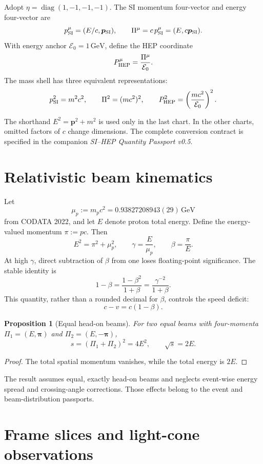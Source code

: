 \documentclass[11pt,a4paper]{article}
\theoremstyle{definition}
\theoremstyle{plain}
\newtheorem{proposition}[definition]{Proposition}
\theoremstyle{remark}
\newcommand{\diag}{\operatorname{diag}}
\newcommand{\GeV}{\mathrm{GeV}}
\newcommand{\Ecal}{\mathcal E}
\begin{document}
Adopt \(\eta=\diag(1,-1,-1,-1)\). The SI momentum four-vector and
energy four-vector are
\[
p^\mu_{\rm SI}=(E/c,\bm p_{\rm SI}),\qquad
\Pi^\mu=c\,p^\mu_{\rm SI}=(E,c\bm p_{\rm SI}).
\]
With energy anchor \(\Ecal_0=1\,\GeV\), define the HEP coordinate
\[
P^\mu_{\rm HEP}=\frac{\Pi^\mu}{\Ecal_0}.
\]
The mass shell has three equivalent representations:
\[
p_{\rm SI}^2=m^2c^2,\qquad
\Pi^2=(mc^2)^2,\qquad
P_{\rm HEP}^2=\left(\frac{mc^2}{\Ecal_0}\right)^2.
\]

The shorthand \(E^2=\bm p^2+m^2\) is used only in the last chart.
In the other charts, omitted factors of \(c\) change dimensions.
The complete conversion contract is specified in the companion
\emph{SI--HEP Quantity Passport v0.5}.

\section{Relativistic beam kinematics}

Let
\[
\mu_p:=m_pc^2=0.93827208943(29)\,\GeV
\]
from CODATA 2022, and let \(E\) denote proton total energy. Define the
energy-valued momentum \(\pi:=pc\). Then
\[
E^2=\pi^2+\mu_p^2,\qquad
\gamma=\frac{E}{\mu_p},\qquad
\beta=\frac{\pi}{E}.
\]
At high \(\gamma\), direct subtraction of \(\beta\) from one loses
floating-point significance. The stable identity is
\[
1-\beta
=\frac{1-\beta^2}{1+\beta}
=\frac{\gamma^{-2}}{1+\beta}.
\]
This quantity, rather than a rounded decimal for \(\beta\), controls
the speed deficit:
\[
c-v=c(1-\beta).
\]

\begin{proposition}[Equal head-on beams]
For two equal beams with four-momenta
\(\Pi_1=(E,\bm\pi)\) and
\(\Pi_2=(E,-\bm\pi)\),
\[
s=(\Pi_1+\Pi_2)^2=4E^2,\qquad \sqrt{s}=2E.
\]
\end{proposition}

\begin{proof}
The total spatial momentum vanishes, while the total energy is \(2E\).
\end{proof}

The result assumes equal, exactly head-on beams and neglects event-wise
energy spread and crossing-angle corrections. Those effects belong to
the event and beam-distribution passports.

\section{Frame slices and light-cone observations}
\end{document}

